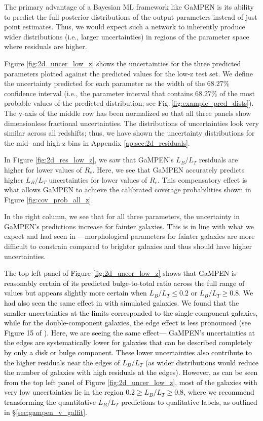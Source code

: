 \documentclass[linenumbers,twocolumn,twocolappendix]{aastex631}
\newcommand\gampen{GaMPEN}
\begin{document}
\begin{CJK*}{UTF8}{gbsn}
The primary advantage of a Bayesian ML framework like \gampen{} is its ability to predict the full posterior distributions of the output parameters instead of just point estimates. Thus, we would expect such a network to inherently produce wider distributions (i.e., larger uncertainties) in regions of the parameter space where residuals are higher. 

Figure \ref{fig:2d_uncer_low_z} shows the uncertainties for the three predicted parameters plotted against the predicted values for the low-z test set. We define the uncertainty predicted for each parameter as the width of the $68.27\%$ confidence interval (i.e., the parameter interval that contains $68.27\%$ of the most probable values of the predicted distribution; see Fig.\,\ref{fig:example_pred_dists}). The y-axis of the middle row has been normalized so that all three panels show dimensionless fractional uncertainties. The distributions of uncertainties look very similar across all redshifts; thus, we have shown the uncertainty distributions for the mid- and high-z bins in Appendix \ref{ap:sec:2d_residuals}.

In Figure \ref{fig:2d_res_low_z}, we saw that \gampen{}'s $L_B/L_T$ residuals are higher for lower values of $R_e$. Here, we see that \gampen{} accurately predicts higher $L_B/L_T$ uncertainties for lower values of $R_e$. This compensatory effect is what allows \gampen{} to achieve the calibrated coverage probabilities shown in Figure \ref{fig:cov_prob_all_z}. 

In the right column, we see that for all three parameters, the uncertainty in \gampen{}'s predictions increase for fainter galaxies. This is in line with what we expect and had seen in \citet{gampen_software_paper}---morphological parameters for fainter galaxies are more difficult to constrain compared to brighter galaxies and thus should have higher uncertainties. 

\textcolor{black}{The top left panel of Figure \ref{fig:2d_uncer_low_z} shows that \gampen{} is reasonably certain of its predicted %
bulge-to-total ratio across the full range of values but appears slightly more certain when $L_B/L_T \leq 0.2$ or $L_B/L_T \geq 0.8$. We had also seen the same effect in \citet{gampen_software_paper} with simulated galaxies. We found that the smaller uncertainties at the limits corresponded to the single-component galaxies, while for the double-component galaxies, the edge effect is less pronounced (see Figure 15 of \citet{gampen_software_paper}). Here, we are seeing the same effect--- \gampen{}'s uncertainties at the edges are systematically lower for galaxies that can be described completely by only a disk or bulge component. These lower uncertainties also contribute to the higher residuals near the edges of $L_B/L_T$ (as wider distributions would reduce the number of galaxies with high residuals at the edges). However, as can be seen from the top left panel of Figure \ref{fig:2d_uncer_low_z}, most of the galaxies with very low uncertainties lie in the region $0.2 \geq L_B/L_T \geq 0.8$, where we recommend transforming the quantitative $L_B/L_T$ predictions to qualitative labels, as outlined in \S \ref{sec:gampen_v_galfit}}.


\end{CJK*}
\end{document}
